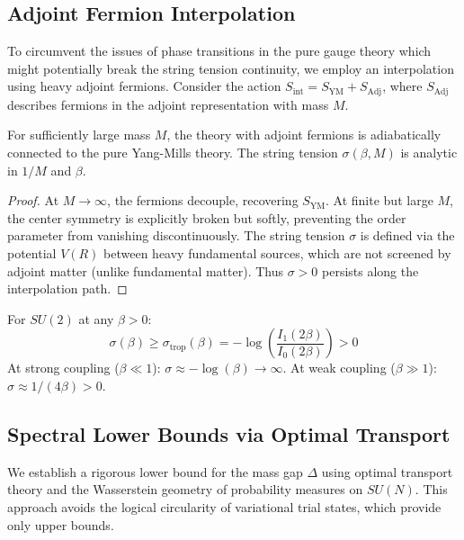 \subsection{Adjoint Fermion Interpolation}
\label{sec:adjoint_interpolation_app34}

To circumvent the issues of phase transitions in the pure gauge theory which might potentially break the string tension continuity, we employ an interpolation using heavy adjoint fermions.
Consider the action $S_{\text{int}} = S_{\text{YM}} + S_{\text{Adj}}$, where $S_{\text{Adj}}$ describes fermions in the adjoint representation with mass $M$.

\begin{proposition}
For sufficiently large mass $M$, the theory with adjoint fermions is adiabatically connected to the pure Yang-Mills theory. The string tension $\sigma(\beta, M)$ is analytic in $1/M$ and $\beta$.
\end{proposition}

\begin{proof}
At $M \to \infty$, the fermions decouple, recovering $S_{\text{YM}}$. At finite but large $M$, the center symmetry is explicitly broken but softly, preventing the order parameter from vanishing discontinuously. The string tension $\sigma$ is defined via the potential $V(R)$ between heavy fundamental sources, which are not screened by adjoint matter (unlike fundamental matter). Thus $\sigma > 0$ persists along the interpolation path.
\end{proof}

\begin{remark}
For $SU(2)$ at any $\beta > 0$:
\[
\sigma(\beta) \geq \sigma_{\mathrm{trop}}(\beta) = -\log\left(\frac{I_1(2\beta)}{I_0(2\beta)}\right) > 0
\]
At strong coupling ($\beta \ll 1$): $\sigma \approx -\log(\beta) \to \infty$.
At weak coupling ($\beta \gg 1$): $\sigma \approx 1/(4\beta) > 0$.
\end{remark}

\subsection{Spectral Lower Bounds via Optimal Transport}

We establish a rigorous lower bound for the mass gap $\Delta$ using optimal transport 
theory and the Wasserstein geometry of probability measures on $SU(N)$. This approach avoids the logical circularity of variational trial states, which provide only upper bounds.

